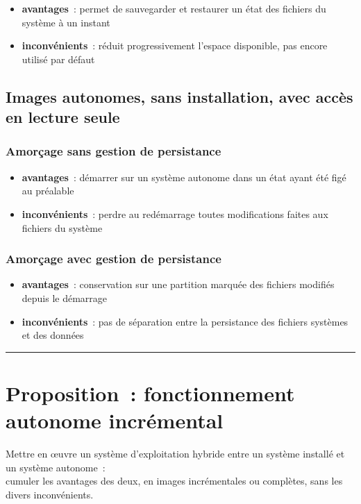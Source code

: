 \documentclass[10pt]{article}
\newcommand{\hr}{\rule{\textwidth}{1pt}}
\newenvironment{itmz}{\begin{itemize}
\setlength{\itemsep}{0em}
}{\end{itemize}}
\begin{document}
\begin{itmz}
\item{\textbf{avantages} : permet de sauvegarder et restaurer un état des fichiers du système à un instant}
\item{\textbf{inconvénients} : réduit progressivement l’espace disponible, pas encore utilisé par défaut}
\end{itmz}

\subsection{Images autonomes, sans installation, avec accès en lecture seule}

\subsubsection{Amorçage sans gestion de persistance}

\begin{itmz}
\item{\textbf{avantages} : démarrer sur un système autonome dans un état ayant été figé au préalable}
\item{\textbf{inconvénients} : perdre au redémarrage toutes modifications faites aux fichiers du système}
\end{itmz}

\subsubsection{Amorçage avec gestion de persistance}

\begin{itmz}
\item{\textbf{avantages} : conservation sur une partition marquée des fichiers modifiés depuis le démarrage}
\item{\textbf{inconvénients} : pas de séparation entre la persistance des fichiers systèmes et des données}
\end{itmz}

\hr

\section{Proposition : fonctionnement autonome incrémental}

Mettre en œuvre un système d’exploitation hybride entre un système installé et un système autonome :\\
cumuler les avantages des deux, en images incrémentales ou complètes, sans les divers inconvénients.
\end{document}
